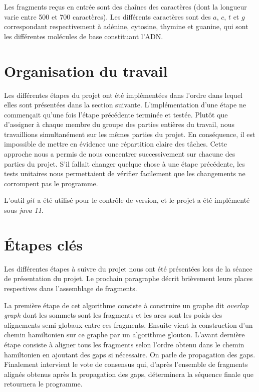 \documentclass{article}
\begin{document}
Les fragments reçus en entrée sont des chaînes des caractères (dont la longueur varie entre 500 et 700 caractères). Les différents caractères sont des $a$, $c$, $t$ et $g$ correspondant respectivement à adénine, cytosine, thymine et guanine, qui sont les différentes molécules de base constituant l'ADN.


\section{Organisation du travail}

Les différentes étapes du projet ont été implémentées dans l'ordre dans lequel elles sont présentées dans la section suivante. 
L'implémentation d'une étape ne commençait qu'une fois l'étape précédente terminée et testée. Plutôt que d'assigner à chaque membre du groupe des parties entières du travail, nous travaillions simultanément sur les mêmes parties du projet. En conséquence, il est impossible de mettre en évidence une répartition claire des tâches. Cette approche nous a permis de nous concentrer successivement sur chacune des parties du projet. S'il fallait changer quelque chose à une étape précédente, les tests unitaires nous permettaient de vérifier facilement que les changements ne corrompent pas le programme.

L'outil $git$ a été utilisé pour le contrôle de version, et le projet a été implémenté sous \textit{java 11}.


\newpage

\section{\'Etapes clés}

Les différentes étapes à suivre du projet nous ont été présentées lors de la séance de présentation du projet. Le prochain paragraphe décrit brièvement leurs places respectives dans l'assemblage de fragments.

La première étape de cet algorithme consiste à construire un graphe dit \textit{overlap graph} dont les sommets sont les fragments   et les arcs sont les poids des alignements semi-globaux entre ces fragments.
Ensuite vient la construction d'un chemin hamiltonien sur ce graphe par un algorithme glouton.
L'avant dernière étape consiste à aligner tous les fragments selon l'ordre obtenu dans le chemin hamiltonien en ajoutant des gaps si nécessaire. On parle de propagation des gaps.
Finalement intervient le vote de consensus qui, d'après l'ensemble de fragments alignés obtenus après la propagation des gaps, déterminera la séquence finale que retournera le programme.
\end{document}
